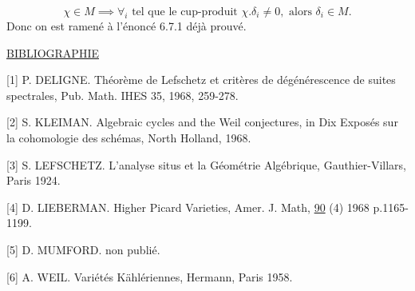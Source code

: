 \begin{equation*}
\chi \in M \implies \forall_i \text{ tel que le cup-produit } \chi.\delta_i \neq 0, \text{ alors } \delta_i \in M.
\end{equation*}
Donc on est ramené à l'énoncé 6.7.1 déjà prouvé.


\underline{BIBLIOGRAPHIE}

[1] P. DELIGNE. Théorème de Lefschetz et critères de dégénérescence de suites spectrales, Pub. Math. IHES 35, 1968, 259-278.

[2] S. KLEIMAN. Algebraic cycles and the Weil conjectures, in Dix Exposés sur la cohomologie des schémas, North Holland, 1968.

[3] S. LEFSCHETZ. L'analyse situs et la Géométrie Algébrique, Gauthier-Villars, Paris 1924.

[4] D. LIEBERMAN. Higher Picard Varieties, Amer. J. Math, \underline{90} (4) 1968 p.1165-1199.

[5] D. MUMFORD. non publié.

[6] A. WEIL. Variétés Kählériennes, Hermann, Paris 1958.
